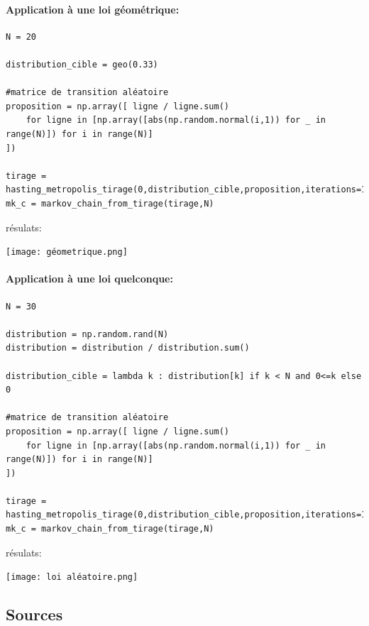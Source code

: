 \documentclass{article}
\begin{document}
\newpage
\paragraph{Application à une loi géométrique:}

\begin{verbatim}
N = 20

distribution_cible = geo(0.33)

#matrice de transition aléatoire
proposition = np.array([ ligne / ligne.sum()
    for ligne in [np.array([abs(np.random.normal(i,1)) for _ in range(N)]) for i in range(N)]
])

tirage = hasting_metropolis_tirage(0,distribution_cible,proposition,iterations=100_000)
mk_c = markov_chain_from_tirage(tirage,N)
\end{verbatim}

résulats:

\texttt{[image: géometrique.png]}

\newpage
\paragraph{Application à une loi quelconque:}

\begin{verbatim}
N = 30

distribution = np.random.rand(N)
distribution = distribution / distribution.sum()

distribution_cible = lambda k : distribution[k] if k < N and 0<=k else 0

#matrice de transition aléatoire
proposition = np.array([ ligne / ligne.sum()
    for ligne in [np.array([abs(np.random.normal(i,1)) for _ in range(N)]) for i in range(N)]
])

tirage = hasting_metropolis_tirage(0,distribution_cible,proposition,iterations=100_000)
mk_c = markov_chain_from_tirage(tirage,N)
\end{verbatim}

résulats:

\texttt{[image: loi aléatoire.png]}


















\newpage

\subsection{Sources}
\end{document}

